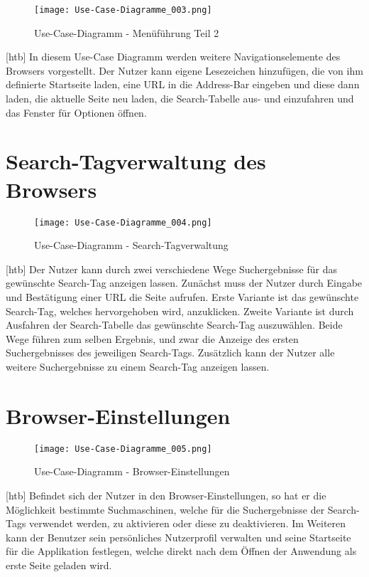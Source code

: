 \begin{figure}[htb]
\texttt{[image: Use-Case-Diagramme\_003.png]}
	\caption{Use-Case-Diagramm - Menüführung Teil 2}
	\label{fig:Menüführung Teil 2}
\end{figure}[htb]
In diesem Use-Case Diagramm werden weitere Navigationselemente des Browsers vorgestellt. Der Nutzer kann eigene Lesezeichen hinzufügen, die von ihm definierte Startseite laden, eine URL in die Address-Bar eingeben und diese dann laden, die aktuelle Seite neu laden, die Search-Tabelle aus- und einzufahren und das Fenster für Optionen öffnen.

\section{Search-Tagverwaltung des Browsers}
\begin{figure}[htb]
\texttt{[image: Use-Case-Diagramme\_004.png]}
	\caption{Use-Case-Diagramm - Search-Tagverwaltung}
	\label{fig:Search-Tagverwaltung}
\end{figure}[htb]
Der Nutzer kann durch zwei verschiedene Wege Suchergebnisse für das gewünschte Search-Tag anzeigen lassen. Zunächst muss der Nutzer durch Eingabe und Bestätigung einer URL die Seite aufrufen. Erste Variante ist das gewünschte Search-Tag, welches hervorgehoben wird, anzuklicken. Zweite Variante ist durch Ausfahren der Search-Tabelle das gewünschte Search-Tag auszuwählen. Beide Wege führen zum selben Ergebnis, und zwar die Anzeige des ersten Suchergebnisses des jeweiligen Search-Tags. Zusätzlich kann der Nutzer alle weitere Suchergebnisse zu einem Search-Tag anzeigen lassen.

\section{Browser-Einstellungen}
\begin{figure}[htb]
\texttt{[image: Use-Case-Diagramme\_005.png]}
	\caption{Use-Case-Diagramm - Browser-Einstellungen}
	\label{fig:Browser-Einstellungen}
\end{figure}[htb]
Befindet sich der Nutzer in den Browser-Einstellungen, so hat er die Möglichkeit bestimmte Suchmaschinen, welche für die Suchergebnisse der Search-Tags verwendet werden, zu aktivieren oder diese zu deaktivieren. Im Weiteren kann der Benutzer sein persönliches Nutzerprofil verwalten und seine Startseite für die Applikation festlegen, welche direkt nach dem Öffnen der Anwendung als erste Seite geladen wird.
